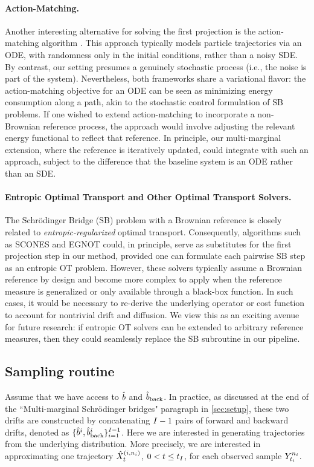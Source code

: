 \paragraph{Action-Matching.} Another interesting alternative for solving the first projection is the action-matching algorithm \citep{neklyudov2023action}.
This approach typically models particle trajectories via an ODE, with randomness only in the initial conditions, rather than a noisy SDE. By contrast, our setting presumes a genuinely stochastic process (i.e., the noise is part of the system). Nevertheless, both frameworks share a variational flavor: the action-matching objective for an ODE can be seen as minimizing energy consumption along a path, akin to the stochastic control formulation of SB problems. If one wished to extend action-matching to incorporate a non-Brownian reference process, the approach would involve adjusting the relevant energy functional to reflect that reference. In principle, our multi-marginal extension, where the reference is iteratively updated, could integrate with such an approach, subject to the difference that the baseline system is an ODE rather than an SDE.

\paragraph{Entropic Optimal Transport and Other Optimal Transport Solvers.} The Schr\"odinger Bridge (SB) problem with a Brownian reference is closely related to \emph{entropic-regularized} optimal transport. Consequently, algorithms such as SCONES \citep{daniels2021score} and EGNOT \citep{mokrov2023energy} could, in principle, serve as substitutes for the first projection step in our method, provided one can formulate each pairwise SB step as an entropic OT problem. However, these solvers typically assume a Brownian reference by design and become more complex to apply when the reference measure is generalized or only available through a black-box function. In such cases, it would be necessary to re-derive the underlying operator or cost function to account for nontrivial drift and diffusion. We view this as an exciting avenue for future research: if entropic OT solvers can be extended to arbitrary reference measures, then they could seamlessly replace the SB subroutine in our pipeline.

\subsection{Sampling routine}
\label{sec:sampling-routine}
Assume that we have access to $\estimatedrift$ and $\estimatebkwdrift$. In practice, as discussed at the end of the ``Multi-marginal Schrödinger bridges" paragraph in \cref{sec:setup}, these two drifts are constructed by concatenating $I-1$ pairs of forward and backward drifts, denoted as $\{\estimatedriftstep{i},\estimatebackwarddriftstep{i}\}_{\timeidx = 1}^{\totsteps-1}$. Here we are interested in generating trajectories from the underlying distribution. More precisely, we are interested in approximating one trajectory $\simulatedresponseat{\timet}^{ (\timeidx,\sampleidx_{\timeidx}) }$, ${0< t\le t_{I}}$, for each observed sample $\obsat{\timestep{\timeidx}}^{\sampleidx_{\timeidx}}$. 

